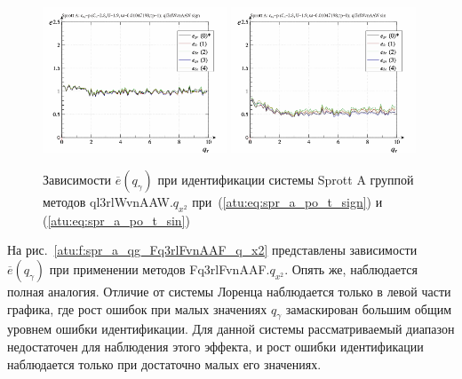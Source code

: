 \begin{figure}[htb!]
  \centerline{
    \includegraphics[width=0.49\textwidth]{p/cha/spr_a/ql3rlWvnAAW_x2/sprott_a_id-p_q_gamma_sign.png}
    \hfill
    \includegraphics[width=0.49\textwidth]{p/cha/spr_a/ql3rlWvnAAW_x2/sprott_a_id-p_q_gamma_sin.png}
  }
  \caption{Зависимости $\overline{e}(q_\gamma)$ при идентификации системы Sprott A группой методов ql3rlWvnAAW.$q_{x^2}$
   при~(\ref{atu:eq:spr_a_po_t_sign}) и (\ref{atu:eq:spr_a_po_t_sin})}
  \label{atu:f:spr_a_ql3rlWvnAAW_q_x2}
\end{figure}

На рис.~\ref{atu:f:spr_a_qg_Fq3rlFvnAAF_q_x2} представлены зависимости
$\overline{e}(q_\gamma)$ при применении методов Fq3rlFvnAAF.$q_{x^2}$.
Опять же, наблюдается полная аналогия. Отличие от системы Лоренца наблюдается только
в левой части графика, где рост ошибок при
малых значениях $q_\gamma$ замаскирован большим общим уровнем ошибки идентификации.
Для данной системы рассматриваемый диапазон недостаточен для наблюдения этого эффекта,
и рост ошибки идентификации наблюдается только при достаточно малых его значениях.

